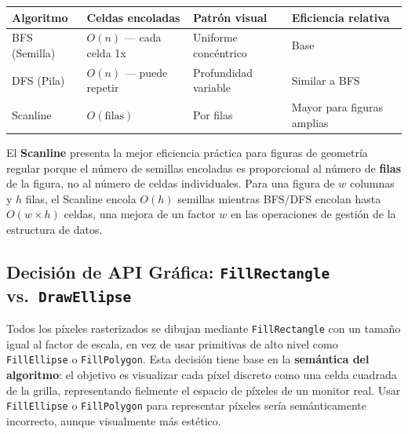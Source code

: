 \documentclass[
  spanish,
  a4paper,
  12pt,
]{article}
\newcommand{\passthrough}[1]{#1}
\newcounter{none} %
\begin{document}
{\def\LTcaptype{none} %
\begin{longtable}[]{@{}
  >{\raggedright\arraybackslash}p{}
  >{\raggedright\arraybackslash}p{}
  >{\raggedright\arraybackslash}p{}
  >{\raggedright\arraybackslash}p{}@{}}
\toprule\noalign{}
\begin{minipage}[b]{\linewidth}\raggedright
Algoritmo
\end{minipage} & \begin{minipage}[b]{\linewidth}\raggedright
Celdas encoladas
\end{minipage} & \begin{minipage}[b]{\linewidth}\raggedright
Patrón visual
\end{minipage} & \begin{minipage}[b]{\linewidth}\raggedright
Eficiencia relativa
\end{minipage} \\
\midrule\noalign{}
\endhead
\bottomrule\noalign{}
\endlastfoot
BFS (Semilla) & \(O(n)\) --- cada celda 1x & Uniforme concéntrico &
Base \\
DFS (Pila) & \(O(n)\) --- puede repetir & Profundidad variable & Similar
a BFS \\
Scanline & \(O(\text{filas})\) & Por filas & Mayor para figuras
amplias \\
\end{longtable}
}

El \textbf{Scanline} presenta la mejor eficiencia práctica para figuras
de geometría regular porque el número de semillas encoladas es
proporcional al número de \textbf{filas} de la figura, no al número de
celdas individuales. Para una figura de \(w\) columnas y \(h\) filas, el
Scanline encola \(O(h)\) semillas mientras BFS/DFS encolan hasta
\(O(w \times h)\) celdas, una mejora de un factor \(w\) en las
operaciones de gestión de la estructura de datos.

\subsection{\texorpdfstring{Decisión de API Gráfica:
\texttt{FillRectangle}
vs.~\texttt{DrawEllipse}}{8.3. Decisión de API Gráfica: FillRectangle vs.~DrawEllipse}}\label{decisiuxf3n-de-api-gruxe1fica-fillrectangle-vs.-drawellipse}

Todos los píxeles rasterizados se dibujan mediante
\passthrough{\lstinline!FillRectangle!} con un tamaño igual al factor de
escala, en vez de usar primitivas de alto nivel como
\passthrough{\lstinline!FillEllipse!} o
\passthrough{\lstinline!FillPolygon!}. Esta decisión tiene base en la
\textbf{semántica del algoritmo}: el objetivo es visualizar cada píxel
discreto como una celda cuadrada de la grilla, representando fielmente
el espacio de píxeles de un monitor real. Usar
\passthrough{\lstinline!FillEllipse!} o
\passthrough{\lstinline!FillPolygon!} para representar píxeles sería
semánticamente incorrecto, aunque visualmente más estético.
\end{document}
